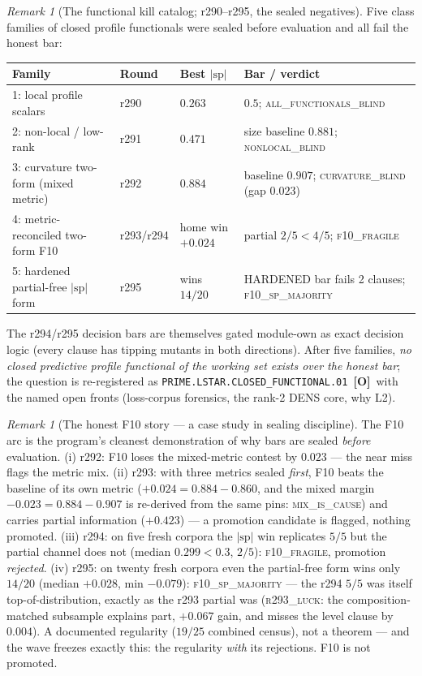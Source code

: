 \documentclass[11pt]{article}
\newcommand{\mO}{\textcolor{openred}{\textbf{[O]}}}
\theoremstyle{definition}
\theoremstyle{remark}
\newtheorem{remark}[theorem]{Remark}
\begin{document}
\begin{remark}[The functional kill catalog; r290--r295, the sealed
negatives]\label{rem:killcatalog}
Five class families of closed profile functionals were sealed before
evaluation and all fail the honest bar:
\begin{center}\small
\begin{tabular}{@{}llll@{}}
\toprule
\textbf{Family} & \textbf{Round} & \textbf{Best $|\mathrm{sp}|$} &
\textbf{Bar / verdict}\\
\midrule
1: local profile scalars & r290 & $0.263$ &
$0.5$; \textsc{all\_functionals\_blind}\\
2: non-local / low-rank & r291 & $0.471$ &
size baseline $0.881$; \textsc{nonlocal\_blind}\\
3: curvature two-form (mixed metric) & r292 & $0.884$ &
baseline $0.907$; \textsc{curvature\_blind} (gap $0.023$)\\
4: metric-reconciled two-form F10 & r293/r294 &
home win $+0.024$ & partial $2/5 < 4/5$;
\textsc{f10\_fragile}\\
5: hardened partial-free $|\mathrm{sp}|$ form & r295 &
wins $14/20$ & HARDENED bar fails 2 clauses;
\textsc{f10\_sp\_majority}\\
\bottomrule
\end{tabular}
\end{center}
The r294/r295 decision bars are themselves gated module-own as exact
decision logic (every clause has tipping mutants in both directions).
After five families, \emph{no closed predictive profile functional of
the working set exists over the honest bar}; the question is
re-registered as \texttt{PRIME.LSTAR.CLOSED\_FUNCTIONAL.01}~\mO\ with
the named open fronts (loss-corpus forensics, the rank-2 DENS core,
why L2).
\end{remark}

\begin{remark}[The honest F10 story --- a case study in sealing
discipline]\label{rem:f10story}
The F10 arc is the program's cleanest demonstration of why bars are
sealed \emph{before} evaluation.  (i) r292: F10 loses the mixed-metric
contest by $0.023$ --- the near miss flags the metric mix.
(ii) r293: with three metrics sealed \emph{first}, F10 beats the
baseline of its own metric ($+0.024 = 0.884 - 0.860$, and the mixed
margin $-0.023 = 0.884 - 0.907$ is re-derived from the same pins:
\textsc{mix\_is\_cause}) and carries partial information ($+0.423$) —
a promotion candidate is flagged, nothing promoted.  (iii) r294: on
five fresh corpora the $|\mathrm{sp}|$ win replicates $5/5$ but the
partial channel does not (median $0.299 < 0.3$, $2/5$):
\textsc{f10\_fragile}, promotion \emph{rejected}.  (iv) r295: on
twenty fresh corpora even the partial-free form wins only $14/20$
(median $+0.028$, min $-0.079$): \textsc{f10\_sp\_majority} --- the
r294 $5/5$ was itself top-of-distribution, exactly as the r293
partial was (\textsc{r293\_luck}: the composition-matched subsample
explains part, $+0.067$ gain, and misses the level clause by
$0.004$).  A documented regularity ($19/25$ combined census), not a
theorem --- and the wave freezes exactly this: the regularity
\emph{with} its rejections.  F10 is not promoted.
\end{remark}
\end{document}
